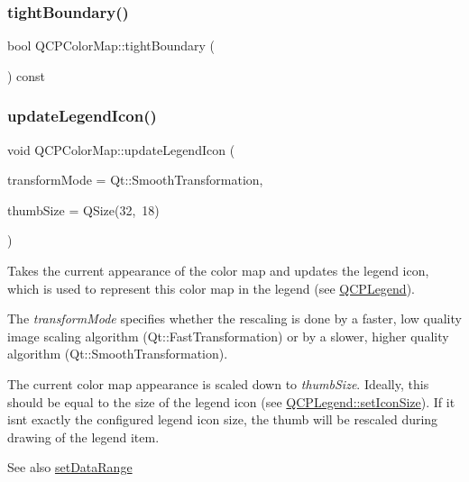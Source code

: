 \subsubsection{\texorpdfstring{tight\+Boundary()}{tightBoundary()}}
{\footnotesize\ttfamily bool Q\+C\+P\+Color\+Map\+::tight\+Boundary (\begin{DoxyParamCaption}{ }\end{DoxyParamCaption}) const\hspace{0.3cm}{\ttfamily [inline]}}

\mbox{\label{class_q_c_p_color_map_a5d8158b62d55fcfeaabcb68ce0083e87}} 
\subsubsection{\texorpdfstring{update\+Legend\+Icon()}{updateLegendIcon()}}
{\footnotesize\ttfamily void Q\+C\+P\+Color\+Map\+::update\+Legend\+Icon (\begin{DoxyParamCaption}\item[{Qt\+::\+Transformation\+Mode}]{transform\+Mode = {\ttfamily Qt\+:\+:SmoothTransformation},  }\item[{const Q\+Size \&}]{thumb\+Size = {\ttfamily QSize(32,~18)} }\end{DoxyParamCaption})}

Takes the current appearance of the color map and updates the legend icon, which is used to represent this color map in the legend (see \hyperlink{class_q_c_p_legend}{Q\+C\+P\+Legend}).

The {\itshape transform\+Mode} specifies whether the rescaling is done by a faster, low quality image scaling algorithm (Qt\+::\+Fast\+Transformation) or by a slower, higher quality algorithm (Qt\+::\+Smooth\+Transformation).

The current color map appearance is scaled down to {\itshape thumb\+Size}. Ideally, this should be equal to the size of the legend icon (see \hyperlink{class_q_c_p_legend_a8b0740cce488bf7010da6beda6898984}{Q\+C\+P\+Legend\+::set\+Icon\+Size}). If it isn\textquotesingle{}t exactly the configured legend icon size, the thumb will be rescaled during drawing of the legend item.

\begin{DoxySeeAlso}{See also}
\hyperlink{class_q_c_p_color_map_a980b42837821159786a85b4b7dcb8774}{set\+Data\+Range} 
\end{DoxySeeAlso}
\mbox{\label{class_q_c_p_color_map_a5efcea591bb5486d968af520a4d43c3a}} 
